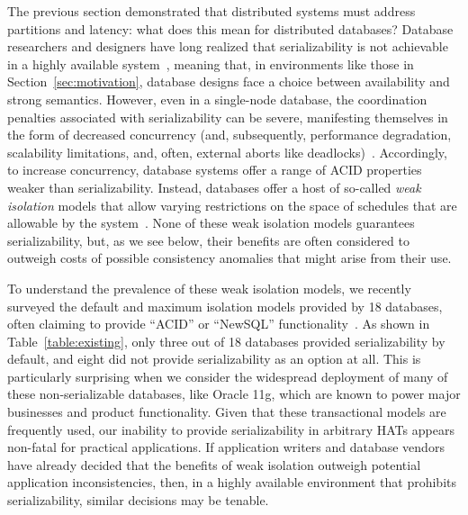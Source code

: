 The previous section demonstrated that distributed systems must
address partitions and latency: what does this mean for distributed
databases? Database researchers and designers have long realized that
serializability is not achievable in a highly available
system~\cite{davidson-survey}, meaning that, in environments like
those in Section~\ref{sec:motivation}, database designs face a choice
between availability and strong semantics. However, even in a
single-node database, the coordination penalties associated with
serializability can be severe, manifesting themselves in the form of
decreased concurrency (and, subsequently, performance degradation,
scalability limitations, and, often, external aborts like
deadlocks)~\cite{gray-isolation}. Accordingly, to increase
concurrency, database systems offer a range of ACID properties weaker
than serializability.  Instead, databases offer a host of so-called
\textit{weak isolation} models that allow varying restrictions on the
space of schedules that are allowable by the system~\cite{adya,
  ansicritique, ansi-sql}. None of these weak isolation models
guarantees serializability, but, as we see below, their benefits are
often considered to outweigh costs of possible consistency anomalies
that might arise from their use.

To understand the prevalence of these weak isolation models, we
recently surveyed the default and maximum isolation models provided by
18 databases, often claiming to provide ``ACID'' or ``NewSQL''
functionality~\cite{hat-hotos}. As shown in
Table~\ref{table:existing}, only three out of 18 databases provided
serializability by default, and eight did not provide serializability
as an option at all. This is particularly surprising when we consider
the widespread deployment of many of these non-serializable databases,
like Oracle 11g, which are known to power major businesses and product
functionality. Given that these transactional models are frequently
used, our inability to provide serializability in arbitrary HATs
appears non-fatal for practical applications. If application writers
and database vendors have already decided that the benefits of weak
isolation outweigh potential application inconsistencies, then, in a
highly available environment that prohibits serializability, similar
decisions may be tenable.

